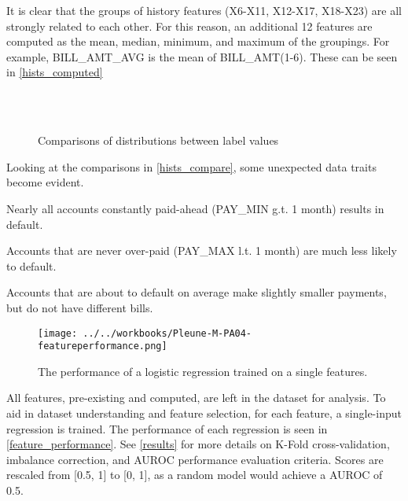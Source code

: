 \documentclass[conference]{IEEEtran}
\begin{document}
It is clear that the groups of history features (X6-X11, X12-X17, X18-X23) are
all strongly related to each other. For this reason, an additional 12 features
are computed as the mean, median, minimum, and maximum of the groupings. For
example, BILL\_AMT\_AVG is the mean of BILL\_AMT(1-6). These can be seen in
\autoref{hists_computed}

\begin{figure}[ht]
	\centering
	\\
	\\
	\caption{Comparisons of distributions between label values}
	\label{hists_compare}
\end{figure}

Looking at the comparisons in \autoref{hists_compare}, some unexpected data
traits become evident.

\begin{IEEEitemize}
	\item Nearly all accounts constantly paid-ahead (PAY\_MIN g.t. 1 month) results in
	default.
	\item Accounts that are never over-paid (PAY\_MAX l.t. 1 month) are much less likely
	to default.
	\item Accounts that are about to default on average make slightly smaller payments,
	but do not have different bills.
\end{IEEEitemize}

\begin{figure}[ht]
	\texttt{[image: ../../workbooks/Pleune-M-PA04-featureperformance.png]}
	\caption{The performance of a logistic regression trained on a single features.}
	\label{feature_performance}
\end{figure}

All features, pre-existing and computed, are left in the dataset for analysis.
To aid in dataset understanding and feature selection, for each feature, a
single-input regression is trained. The performance of each regression is seen
in \autoref{feature_performance}. See \autoref{results} for more details on
K-Fold cross-validation, imbalance correction, and AUROC performance evaluation
criteria. Scores are rescaled from [0.5, 1] to [0, 1], as a random model would
achieve a AUROC of 0.5.
\end{document}
